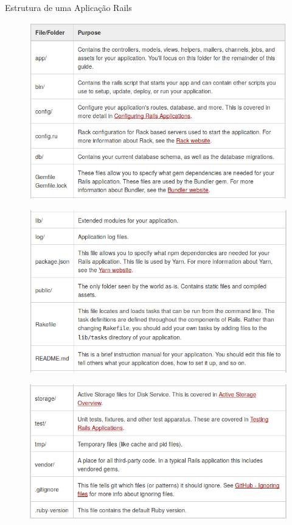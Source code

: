 
\begin{frame}{Estrutura de uma Aplicação Rails}
  \begin{figure}[h]
    \includegraphics[scale=0.35]{imagens/rails-esqueleto-01.png}  
  \end{figure}
  \begin{figure}[h]
    \includegraphics[scale=0.35]{imagens/rails-esqueleto-02.png}  
  \end{figure}
  \begin{figure}[h]
    \includegraphics[scale=0.35]{imagens/rails-esqueleto-03.png}  
  \end{figure}
\end{frame}